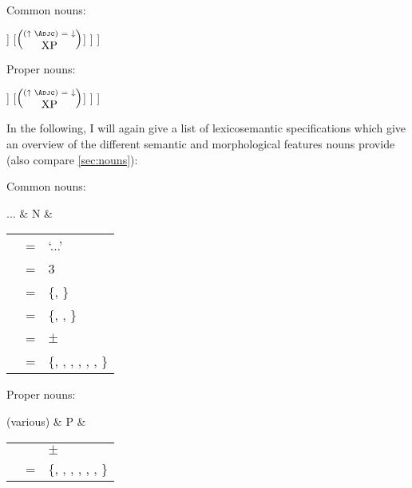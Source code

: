 \ex\label{ex:npcstruct}
\begin{minipage}[t]{.5\linewidth}%
\tl\quad Common nouns:\\

\quad\begin{forest}
[{\anno[\pass{df} \logor{} \pass{gf} \logor{} \updown]{NP}}
	[\anno{\xbar{N}}
		[\anno{\xhead{N}}
			[\anno{N\tsub{stem}}]
			[\anno{\mbox{-N\tsub{infl}}}]
		]
		[{$\left(\anno[\pass{\Adjc}]{XP}\right)$}]
	]
]
\end{forest}
\end{minipage}
%
\begin{minipage}[t]{.5\linewidth}%
\tl\quad Proper nouns:\\

\quad\begin{forest}
[{\anno[\pass{df} \logor{} \pass{gf} \logor{} \updown]{NP}}
	[\anno{\xbar{N}}
		[\anno{\xhead{N}}
			[\anno{\^P}]
			[\anno{\xhead{N}}]
		]
		[{$\left(\anno[\pass{\Adjc}]{XP}\right)$}]
	]
]
\end{forest}
\end{minipage}
\xe

In the following, I will again give a list of lexicosemantic specifications 
which give an overview of the different semantic and morphological features 
nouns provide (also compare \autoref{sec:nouns}):

\pex
\a Common nouns:\\

	\begin{tabu} {}
	...
		& N
		& \begin{tabular}[t]{l l l}
			\ups{\Pred} & = & `...' \\
			\ups{\Pers} & = & 3 \\
			\ups{\Num} & = & \{\Sg{}, \Pl{}\} \\
			\ups{\Gend} & = & \{\M{}, \F{}, \N{}\} \\
			\ups{\Anim} & = & $\pm$ \\
			\ups{\Case} & = & \{\Aarg{}, \Parg{}, \Dat{}, \Gen{}, 
				\Loc{}, \Ins{}, \Caus{}\} \\
		\end{tabular}
	\end{tabu}

\a Proper nouns:\\

	\begin{tabu} {}
	(various)
		& P
		& \begin{tabular}[t]{l l l}
			\ups{\Anim} & \req{} & $\pm$ \\
			\ups{\Case} & = & \{\Aarg{}, \Parg{}, \Dat{}, \Gen{}, 
				\Loc{}, \Ins{}, \Caus{}\} \\
		\end{tabular}
	\end{tabu}\medskip

